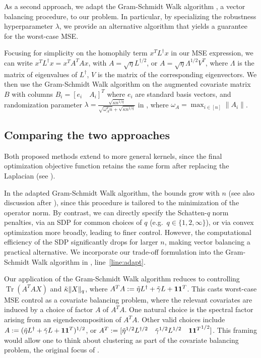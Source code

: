 \documentclass[12pt]{article}
\theoremstyle{definition}
\numberwithin{equation}{section}
\numberwithin{figure}{section}
\numberwithin{equation}{section}
\numberwithin{figure}{section}
\begin{document}
As a second approach, we adapt the Gram-Schmidt Walk algorithm \citep{harshaw2024balancing}, a vector balancing procedure, to our problem. In particular, by specializing the robustness hyperparameter $\lambda$, we provide an alternative algorithm that yields a guarantee for the worst-case MSE.

Focusing for simplicity on the homophily term $x^T L^\dagger x$ in our MSE expression, we can write 
$x^TL^{\dagger}x = x^T A^T A x$,
with $A=\sqrt{\eta} L^{\dagger/2}$, or $A= \sqrt{\eta}\Lambda^{1/2}V^T$, where $\Lambda$ is the matrix of eigenvalues of $L^{\dagger}$, $V$ is the matrix of the corresponding eigenvectors. We then use the Gram-Schmidt Walk algorithm \citep{harshaw2024balancing} on the augmented covariate matrix $B$ with columns $B_i= [e_i \quad A_i]^T$ where $e_i$ are standard basis vectors, and randomization parameter $\lambda = \frac{\sqrt{\kappa n^{1/q}}}{ \sqrt{\omega_A^2n} + \sqrt{\kappa n^{1/q}}}$ in , where $\omega_A = \max_{i \in [n]} \| A_i \|$.

\subsection{Comparing the two approaches} \label{comparison_two_approaches}
Both proposed methods extend to more general kernels, since the final optimization objective function retains the same form after replacing the Laplacian (see ).

In the adapted Gram-Schmidt Walk algorithm, the bounds grow with $n$ (see also discussion after ), since this procedure is tailored to the minimization of the operator norm. By contrast, we can directly specify the Schatten-$q$ norm penalties, via an SDP for common choices of $q$ (e.g.\ $q \in \{1, 2, \infty\}$), or via convex optimization more broadly, leading to finer control.
However, the computational efficiency of the SDP significantly drops for larger $n$, making vector balancing a practical alternative. We incorporate our trade-off formulation into the Gram-Schmidt Walk algorithm \citep{harshaw2024balancing} in , line~\ref{line:adapt}. 

Our application of the Gram-Schmidt Walk algorithm reduces to controlling $\operatorname{Tr}(A^TA X)$ and $\Tilde{\kappa}\| X\|_q$, where $A^TA:= \Tilde{\eta}L^{\dagger} + \Tilde{\gamma} L+ \mathbf{1} \mathbf{1}^T$. This casts worst-case MSE control as a covariate balancing problem, where the relevant covariates are induced by a choice of factor $A$ of $A^TA$. One natural choice is the spectral factor arising from an eigendecomposition of $A^TA$. Other valid choices include $A:= (\Tilde{\eta}L^{\dagger} + \Tilde{\gamma} L+ \mathbf{1} \mathbf{1}^T)^{1/2}$, or $A^T:= [ \Tilde{\eta}^{1/2} L^{\dagger/2} \quad \Tilde{\gamma}^{1/2}L^{1/2} \quad  {\mathbf{1} \mathbf{1}^T}^{1/2}]$.
This framing would allow one to think about clustering as part of the covariate balancing problem, the original focus of \citet{harshaw2024balancing}.  
\end{document}
